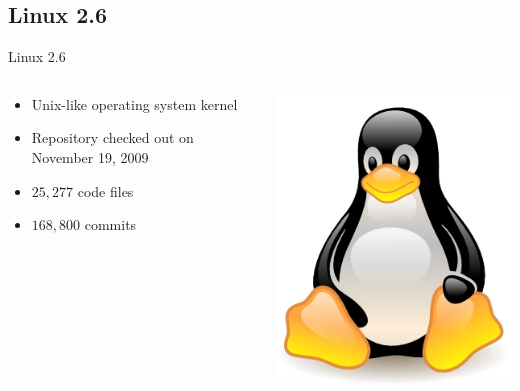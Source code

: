 \subsection{Linux 2.6}

\begin{frame}{Linux 2.6}
  \begin{columns}[c]
    \begin{column}{0.60\textwidth}
      \begin{itemize}
      \item Unix-like operating system kernel
      \item Repository checked out on November 19, 2009
      \item $25,277$ code files
      \item $168,800$ commits
      \end{itemize}
    \end{column}
    \begin{column}{0.40\textwidth}
      \includegraphics[width=\textwidth]{figures/linux-logo}
    \end{column}
  \end{columns}
\end{frame}


